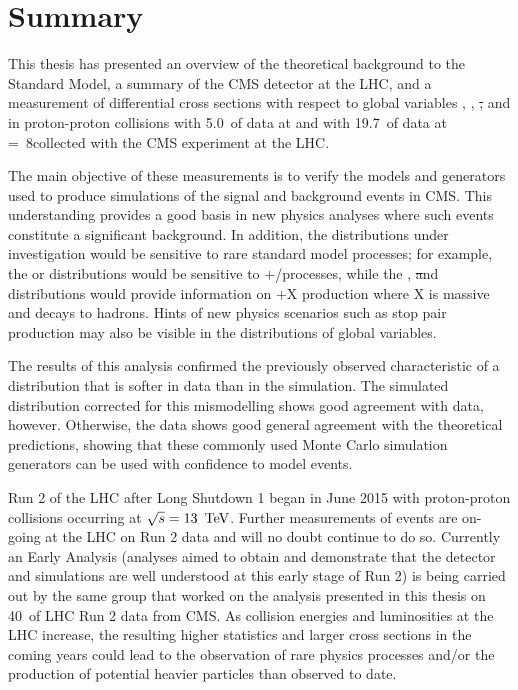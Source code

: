 \chapter{Summary }
\label{c:summary}

This thesis has presented an overview of the theoretical background to the Standard Model, a summary of the
CMS detector at the LHC, and a measurement of differential \ttbar cross sections with respect to global
variables \met, \HT, \st, \mt and \wpt in proton-proton collisions with 5.0~\fbinv of data at \TeV
and with 19.7~\fbinv of data at \roots=~8\TeV collected with the CMS experiment at the LHC. 

The main objective of these measurements is to verify the models and generators used to produce simulations of
the signal and background events in CMS. This understanding provides a good basis in new physics analyses
where such events constitute a significant background. In addition, the distributions under investigation
would be sensitive to rare standard model processes; for example, the \met or \mt distributions would be
sensitive to \ttbar+\Z/\W processes, while the \HT, \st and \wpt distributions would provide information on
\ttbar+X production where X is massive and decays to hadrons. Hints of new physics scenarios such as stop pair
production may also be visible in the distributions of global variables.

The results of this analysis confirmed the previously observed characteristic of a \pt distribution that is
softer in data than in the simulation. The simulated distribution corrected for this mismodelling shows good
agreement with data, however. Otherwise, the data shows good general agreement with the theoretical
predictions, showing that these commonly used Monte Carlo simulation generators can be used with confidence to
model \ttbar events.

Run 2 of the LHC after Long Shutdown 1 began in June 2015 with proton-proton collisions occurring at
$\sqrt{s}=13~\,\text{Te\hspace{-.08em}V}$. Further measurements of \ttbar events are on-going at the LHC on Run 2 data and will no
doubt continue to do so. Currently an Early Analysis (analyses aimed to obtain and demonstrate that the
detector and simulations are well understood at this early stage of Run 2) is being carried out by the same
group that worked on the analysis presented in this thesis on 40~\pbinv of LHC Run 2 data from CMS. As
collision energies and luminosities at the LHC increase, the resulting higher statistics and larger
cross sections in the coming years could lead to the observation of rare physics processes and/or the
production of potential heavier particles than observed to date.

